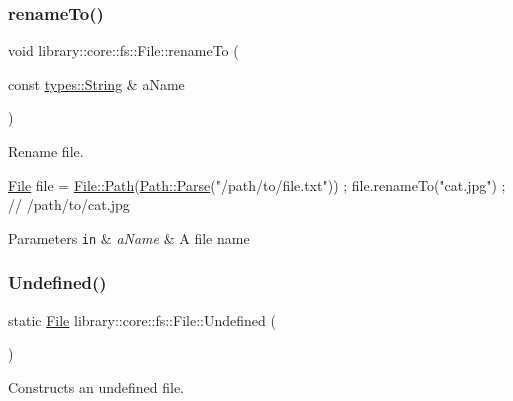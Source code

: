 \subsubsection{\texorpdfstring{rename\+To()}{renameTo()}}
{\footnotesize\ttfamily void library\+::core\+::fs\+::\+File\+::rename\+To (\begin{DoxyParamCaption}\item[{const \hyperlink{classlibrary_1_1core_1_1types_1_1_string}{types\+::\+String} \&}]{a\+Name }\end{DoxyParamCaption})}



Rename file. 


\begin{DoxyCode}
\hyperlink{classlibrary_1_1core_1_1fs_1_1_file_a7490060f19a21d4ee58bb6cec87a1ca6}{File} file = \hyperlink{classlibrary_1_1core_1_1fs_1_1_file_a0e0d8a8becb3cdd21775554e181452d8}{File::Path}(\hyperlink{classlibrary_1_1core_1_1fs_1_1_path_aebf5bd3af83e0b7376616e146f3e55df}{Path::Parse}(\textcolor{stringliteral}{"/path/to/file.txt"})) ;
file.renameTo(\textcolor{stringliteral}{"cat.jpg"}) ; \textcolor{comment}{// /path/to/cat.jpg}
\end{DoxyCode}



\begin{DoxyParams}[1]{Parameters}
\mbox{\tt in}  & {\em a\+Name} & A file name \\
\hline
\end{DoxyParams}
\mbox{\label{classlibrary_1_1core_1_1fs_1_1_file_a985adb1a33b94dcdbed2792651eb81af}} 
\subsubsection{\texorpdfstring{Undefined()}{Undefined()}}
{\footnotesize\ttfamily static \hyperlink{classlibrary_1_1core_1_1fs_1_1_file}{File} library\+::core\+::fs\+::\+File\+::\+Undefined (\begin{DoxyParamCaption}{ }\end{DoxyParamCaption})\hspace{0.3cm}{\ttfamily [static]}}



Constructs an undefined file. 


